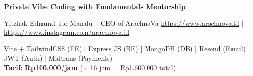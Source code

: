 \documentclass[10pt,a4paper]{article}
\begin{document}
{\Large\bfseries Private Vibe Coding with Fundamentals Mentorship\par}
\vspace{2pt}


\vspace{2pt}
 {\footnotesize Yitzhak Edmund Tio Manalu -- CEO of ArachnoVa \hfill \url{https://www.arachnova.id} $\mid$ \url{https://www.instagram.com/arachnova.id}}

\vspace{2pt}
 {\footnotesize Vite + TailwindCSS (FE) $\mid$ Express JS (BE) $\mid$ MongoDB (DB) $\mid$ Resend (Email) $\mid$ JWT (Auth) $\mid$ Midtrans (Payments)}\\
{\footnotesize\bfseries Tarif:} {\footnotesize\bfseries Rp100.000/jam} {\footnotesize ($\times$ 16 jam = Rp1.600.000 total)}

\vspace{6pt}
\end{document}
